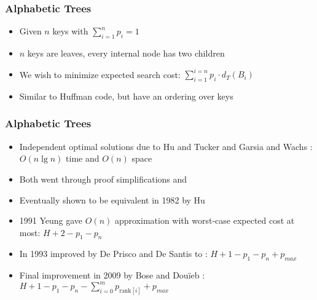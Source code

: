 \documentclass{beamer}
\theoremstyle{plain}
\begin{document}
 
\begin{frame} \frametitle{Alphabetic Trees}
\begin{scriptsize}
\begin{center}
\end{center}
\end{scriptsize}

\begin{itemize}
\item Given $n$ keys with $\sum_{i=1}^{n} p_i = 1$

\item $n$ keys are leaves, every internal node has two children

\item We wish to minimize expected search cost: $\sum_{i=1}^{i=n} p_i \cdot d_T(B_i)$


\item Similar to Huffman code, but have an ordering over keys \cite{huffman1952method}

\end{itemize}

\end{frame}

\begin{frame}\frametitle{Alphabetic Trees}
\begin{itemize}

\item Independent optimal solutions due to Hu and Tucker \cite{hu1971optimal} and Garsia and Wachs \cite{garsia1977new}: $O(n \lg n)$ time and $O(n)$ space

\item Both went through proof simplifications \cite{knuth1973sorting, hu1973new, hu1979binary} and \cite{kingston1988new}

\item Eventually shown to be equivalent in 1982 by Hu \cite{Hu1982Book} 

\item 1991 Yeung gave $O(n)$ approximation with worst-case expected cost at most: $H + 2 - p_1-p_n$ \cite{yeung1991alphabetic}

\item In 1993 improved by De Prisco and De Santis to \cite{de1993binary}: $H+1-p_1-p_n+p_{max}$

\item Final improvement in 2009 by Bose and Dou\"{i}eb \cite{bose2009efficient}:
$H+1 -p_1-p_n-\sum_{i=0}^m p_{\text{rank}[i]} + p_{max}$


\end{itemize}
\end{frame}
\end{document}
